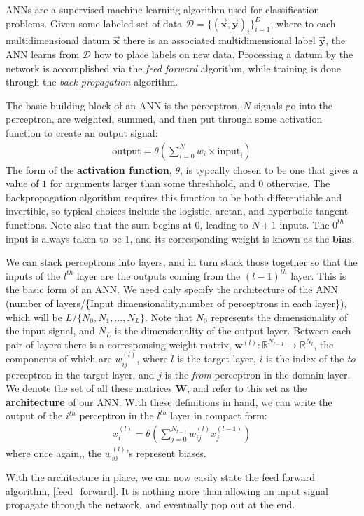 \documentclass[prl,amsmath,amssymb,floatfix,superscriptaddress,notitlepage,twocolumn]{revtex4}
\newcommand{\ee}[1]{\begin{align} #1 \end{align}} 						%
\newcommand{\vc}[1]{\vec{\mathbf{#1}}} 								%
\begin{document}
ANNs are a supervised machine learning algorithm used for classification problems. Given some labeled set of data $\mathcal{D}=\{(\vc x,\vc y)_i\}_{i=1}^D$, where to each multidimensional datum $\vc x$ there is an associated multidimensional label $\vc y$, the ANN learns from $\mathcal{D}$ how to place labels on new data. Processing a datum by the network is accomplished via the \textit{feed forward} algorithm, while training is done through the \textit{back propagation} algorithm. 

The basic building block of an ANN is the perceptron. $N$ signals go into the perceptron, are weighted, summed, and then put through some activation function to create an output signal:
\ee{
\label{perceptron}
\text{output}=\theta(\sum_{i=0}^{N}w_i\times\text{input}_i)
}
The form of the \textbf{activation function}, $\theta$, is typcally chosen to be one that gives a value of $1$ for arguments larger than some threshhold, and $0$ otherwise. The backpropagation algorithm requires this function to be both differentiable and invertible, so typical choices include the logistic, arctan, and hyperbolic tangent functions. Note also that the sum begins at $0$, leading to $N+1$ inputs. The $0^{th}$ input is always taken to be $1$, and its corresponding weight is known as the \textbf{bias}.

We can stack perceptrons into layers, and in turn stack those together so that the inputs of the $l^{th}$ layer are the outputs coming from the $(l-1)^{th}$ layer. This is the basic form of an ANN. We need only specify the architecture of the ANN (number of layers/\{Input dimensionality,number of perceptrons in each layer\}), which will be $L/\{N_0,N_1,\dots,N_L\}$. Note that $N_0$ represents the dimensionality of the input signal, and $N_L$ is the dimensionality of the output layer. Between each pair of layers there is a corresponsing weight matrix, $\textbf{w}^{(l)}:\mathbb{R}^{N_{l-1}}\rightarrow\mathbb{R}^{N_l}$, the components of which are $w_{ij}^{(l)}$, where $l$ is the target layer, $i$ is the index of the \textit{to} perceptron in the target layer, and $j$ is the \textit{from} perceptron in the domain layer. We denote the set of all these matrices \textbf{W}, and refer to this set as the \textbf{architecture} of our ANN. With these definitions in hand, we can write the output of the $i^{th}$ perceptron in the $l^{th}$ layer in compact form:
\ee{
x^{(l)}_i=\theta(\sum_{j=0}^{N_{l-1}}w^{(l)}_{ij}x^{(l-1)}_j)
}
where once again,, the $w^{(l)}_{i0}$'s represent biases. 

With the architecture in place, we can now easily state the feed forward algorithm, \ref{feed_forward}. It is nothing more than allowing an input signal propagate through the network, and eventually pop out at the end.
\end{document}
